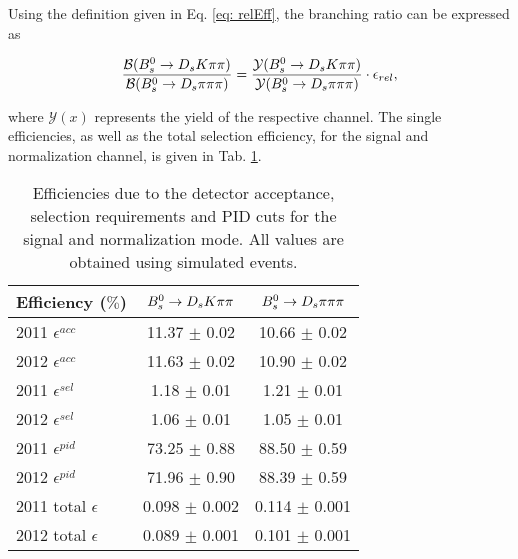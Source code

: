  Using the definition given in Eq. \ref{eq: relEff}, the branching ratio can be expressed as

\begin{equation}
\frac{\mathcal{B}({{B}^0_{s}}\rightarrow{\ensuremath{{D}_{s}}}{\ensuremath{K}}{\ensuremath{\pi}}{\ensuremath{\pi}})}{\mathcal{B}({{B}^0_{s}}\rightarrow{\ensuremath{{D}_{s}}}{\ensuremath{\pi}}{\ensuremath{\pi}}{\ensuremath{\pi}})} = \frac{\mathcal{Y}({{B}^0_{s}}\rightarrow{\ensuremath{{D}_{s}}}{\ensuremath{K}}{\ensuremath{\pi}}{\ensuremath{\pi}})}{\mathcal{Y}({{B}^0_{s}}\rightarrow{\ensuremath{{D}_{s}}}{\ensuremath{\pi}}{\ensuremath{\pi}}{\ensuremath{\pi}})} \cdot \epsilon_{rel},
\label{eq: BRwEff}
\end{equation} 

where $\mathcal{Y}(x)$ represents the yield of the respective channel. \newline
The single efficiencies, as well as the total selection efficiency, for the signal and normalization channel, is given in Tab. \ref{tab: effTab}.

\begin{table}[h!]
\centering
\begin{tabular}{l c c}
Efficiency ($\%$) & ${{B}^0_{s}}\rightarrow{\ensuremath{{D}_{s}}}{\ensuremath{K}}{\ensuremath{\pi}}{\ensuremath{\pi}}$ & ${{B}^0_{s}}\rightarrow{\ensuremath{{D}_{s}}}{\ensuremath{\pi}}{\ensuremath{\pi}}{\ensuremath{\pi}}$\\
\hline
2011 $\epsilon^{acc}$ & 11.37 $\pm$ 0.02 & 10.66 $\pm$ 0.02\\
2012 $\epsilon^{acc}$ & 11.63 $\pm$ 0.02 & 10.90 $\pm$ 0.02\\
2011 $\epsilon^{sel}$ & 1.18 $\pm$ 0.01& 1.21 $\pm$ 0.01\\
2012 $\epsilon^{sel}$ & 1.06 $\pm$ 0.01& 1.05 $\pm$ 0.01\\
2011 $\epsilon^{pid}$ & 73.25 $\pm$ 0.88 & 88.50 $\pm$ 0.59\\
2012 $\epsilon^{pid}$ & 71.96 $\pm$ 0.90 & 88.39 $\pm$ 0.59\\
\hline
2011 total $\epsilon$ & 0.098 $\pm$  0.002& 0.114 $\pm$ 0.001\\
2012 total $\epsilon$ & 0.089 $\pm$  0.001& 0.101 $\pm$ 0.001\\
\hline
\end{tabular}
\caption{Efficiencies due to the detector acceptance, selection requirements and PID cuts for the signal and normalization mode. All values are obtained using simulated events.}
\label{tab: effTab}
\end{table}





